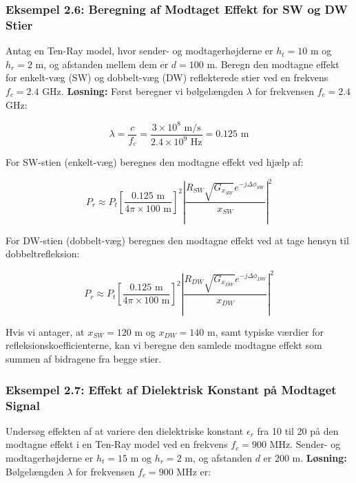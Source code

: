 \documentclass[a4paper,12pt]{book}
\begin{document}
	\subsubsection{Eksempel 2.6: Beregning af Modtaget Effekt for SW og DW Stier}
	
	\noindent Antag en Ten-Ray model, hvor sender- og modtagerhøjderne er \( h_t = 10 \) m og \( h_r = 2 \) m, og afstanden mellem dem er \( d = 100 \) m. Beregn den modtagne effekt for enkelt-væg (SW) og dobbelt-væg (DW) reflekterede stier ved en frekvens \( f_c = 2.4 \) GHz.	
	\newline\newline
	\noindent \textbf{Løsning:} Først beregner vi bølgelængden \( \lambda \) for frekvensen \( f_c = 2.4 \) GHz:
	
	\[
	\lambda = \frac{c}{f_c} = \frac{3 \times 10^8 \text{ m/s}}{2.4 \times 10^9 \text{ Hz}} = 0.125 \text{ m}
	\]
	
	\noindent For SW-stien (enkelt-væg) beregnes den modtagne effekt ved hjælp af:
	
	\[
	P_r \approx P_t \left[ \frac{0.125 \text{ m}}{4\pi \times 100 \text{ m}} \right]^2 \left| \frac{R_{SW} \sqrt{G_{x_{SW}}} e^{-j\Delta \phi_{SW}}}{x_{SW}} \right|^2
	\]
	
	\noindent For DW-stien (dobbelt-væg) beregnes den modtagne effekt ved at tage hensyn til dobbeltrefleksion:
	
	\[
	P_r \approx P_t \left[ \frac{0.125 \text{ m}}{4\pi \times 100 \text{ m}} \right]^2 \left| \frac{R_{DW} \sqrt{G_{x_{DW}}} e^{-j\Delta \phi_{DW}}}{x_{DW}} \right|^2
	\]
	
	\noindent Hvis vi antager, at \( x_{SW} = 120 \text{ m} \) og \( x_{DW} = 140 \text{ m} \), samt typiske værdier for refleksionskoefficienterne, kan vi beregne den samlede modtagne effekt som summen af bidragene fra begge stier.
	
	\subsubsection{Eksempel 2.7: Effekt af Dielektrisk Konstant på Modtaget Signal}
	
	\noindent Undersøg effekten af at variere den dielektriske konstant \( \epsilon_r \) fra 10 til 20 på den modtagne effekt i en Ten-Ray model ved en frekvens \( f_c = 900 \) MHz. Sender- og modtagerhøjderne er \( h_t = 15 \) m og \( h_r = 2 \) m, og afstanden \( d \) er 200 m.
	\newline\newline
	\noindent \textbf{Løsning:} Bølgelængden \( \lambda \) for frekvensen \( f_c = 900 \) MHz er:
	
\end{document}
